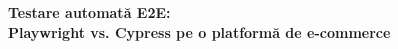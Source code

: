 \documentclass[12pt,a4paper]{report}
\begin{document}
\begin{titlepage}
    \centering
    \vspace*{\fill}
    {\LARGE \textbf{Testare automată E2E:\\[0.4cm]
    Playwright vs. Cypress pe o platformă de e-commerce}}
    \vspace*{\fill}
\end{titlepage}

\setcounter{tocdepth}{0}
\tableofcontents
\newpage








\end{document}
